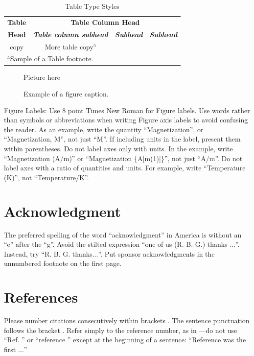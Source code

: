 \documentclass[conference]{IEEEtran}
\begin{document}
\begin{table}[htbp]
\caption{Table Type Styles}
\begin{center}
\begin{tabular}{|c|c|c|c|}
\hline
\textbf{Table}&\multicolumn{3}{|c|}{\textbf{Table Column Head}} \\
\cline{2-4} 
\textbf{Head} & \textbf{\textit{Table column subhead}}& \textbf{\textit{Subhead}}& \textbf{\textit{Subhead}} \\
\hline
copy& More table copy$^{\mathrm{a}}$& &  \\
\hline
\multicolumn{4}{l}{$^{\mathrm{a}}$Sample of a Table footnote.}
\end{tabular}
\label{tab1}
\end{center}
\end{table}

\begin{figure}[htbp]
\centerline{Picture here}
\caption{Example of a figure caption.}
\label{fig}
\end{figure}

Figure Labels: Use 8 point Times New Roman for Figure labels. Use words 
rather than symbols or abbreviations when writing Figure axis labels to 
avoid confusing the reader. As an example, write the quantity 
``Magnetization'', or ``Magnetization, M'', not just ``M''. If including 
units in the label, present them within parentheses. Do not label axes only 
with units. In the example, write ``Magnetization (A/m)'' or ``Magnetization 
\{A[m(1)]\}'', not just ``A/m''. Do not label axes with a ratio of 
quantities and units. For example, write ``Temperature (K)'', not 
``Temperature/K''.

\section*{Acknowledgment}

The preferred spelling of the word ``acknowledgment'' in America is without 
an ``e'' after the ``g''. Avoid the stilted expression ``one of us (R. B. 
G.) thanks $\ldots$''. Instead, try ``R. B. G. thanks$\ldots$''. Put sponsor 
acknowledgments in the unnumbered footnote on the first page.

\section*{References}

Please number citations consecutively within brackets \cite{b1}. The 
sentence punctuation follows the bracket \cite{b2}. Refer simply to the reference 
number, as in \cite{b3}---do not use ``Ref. \cite{b3}'' or ``reference \cite{b3}'' except at 
the beginning of a sentence: ``Reference \cite{b3} was the first $\ldots$''
\end{document}
